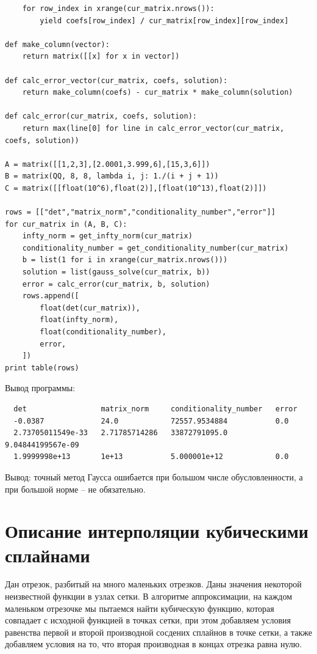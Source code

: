 \documentclass[12pt,reqno]{amsart}
\theoremstyle{definition}
\theoremstyle{remark}
\begin{document}
\begin{lstlisting}
	for row_index in xrange(cur_matrix.nrows()):
		yield coefs[row_index] / cur_matrix[row_index][row_index]

def make_column(vector):
	return matrix([[x] for x in vector])

def calc_error_vector(cur_matrix, coefs, solution):
	return make_column(coefs) - cur_matrix * make_column(solution)

def calc_error(cur_matrix, coefs, solution):
	return max(line[0] for line in calc_error_vector(cur_matrix, coefs, solution))

A = matrix([[1,2,3],[2.0001,3.999,6],[15,3,6]])
B = matrix(QQ, 8, 8, lambda i, j: 1./(i + j + 1))
C = matrix([[float(10^6),float(2)],[float(10^13),float(2)]])

rows = [["det","matrix_norm","conditionality_number","error"]]
for cur_matrix in (A, B, C):
	infty_norm = get_infty_norm(cur_matrix)
	conditionality_number = get_conditionality_number(cur_matrix)
	b = list(1 for i in xrange(cur_matrix.nrows()))
	solution = list(gauss_solve(cur_matrix, b))
	error = calc_error(cur_matrix, b, solution)
	rows.append([
		float(det(cur_matrix)),
		float(infty_norm),
		float(conditionality_number),
		error,
	])
print table(rows)
\end{lstlisting}

Вывод программы:

\begin{lstlisting}
  det                 matrix_norm     conditionality_number   error
  -0.0387             24.0            72557.9534884           0.0
  2.73705011549e-33   2.71785714286   33872791095.0           9.04844199567e-09
  1.9999998e+13       1e+13           5.000001e+12            0.0
\end{lstlisting}

Вывод: точный метод Гаусса ошибается при большом числе обусловленности, а при большой норме -- не обязательно.

\section*{Описание интерполяции кубическими сплайнами}

Дан отрезок, разбитый на много маленьких отрезков. Даны значения некоторой неизвестной функции в узлах сетки. В алгоритме аппроксимации, на каждом маленьком отрезочке мы пытаемся найти кубическую функцию, которая совпадает с исходной функцией в точках сетки, при этом добавляем условия равенства первой и второй производной сосдених сплайнов в точке сетки, а также добавляем условия на то, что вторая производная в концах отрезка равна нулю.
\end{document}
